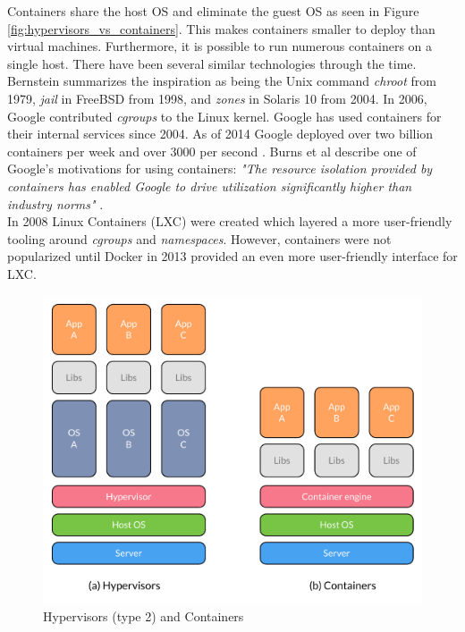 \noindent
Containers share the host OS and eliminate the guest OS as seen in Figure \ref{fig:hypervisors_vs_containers}. This makes containers smaller to deploy than virtual machines. Furthermore, it is possible to run numerous containers on a single host. There have been several similar technologies through the time. Bernstein summarizes the inspiration as being the Unix command \textit{chroot} from 1979, \textit{jail} in FreeBSD from 1998, and \textit{zones} in Solaris 10 from 2004. In 2006, Google contributed \textit{cgroups} to the Linux kernel. Google has used containers for their internal services since 2004. As of 2014 Google deployed over two billion containers per week and over 3000 per second \cite{sanchez2014google_containers}. Burns et al describe one of Google's motivations for using containers: \textit{"The resource isolation provided by containers has enabled Google to drive utilization significantly higher than industry norms"} \cite[p. 4]{burns2016borg_omega_kubernetes}. \\

\noindent
In 2008 Linux Containers (LXC) were created which layered a more user-friendly tooling around \textit{cgroups} and \textit{namespaces}. However, containers were not popularized until Docker in 2013 provided an even more user-friendly interface for LXC.

\begin{figure}[H]
    \centering
    \includegraphics[scale=0.6]{figures/hypervisor_vs_container}
    \caption{Hypervisors (type 2) and Containers \cite[p. 82]{bernstein2014containers}}
\end{figure}
\label{fig:hypervisors_vs_containers}

